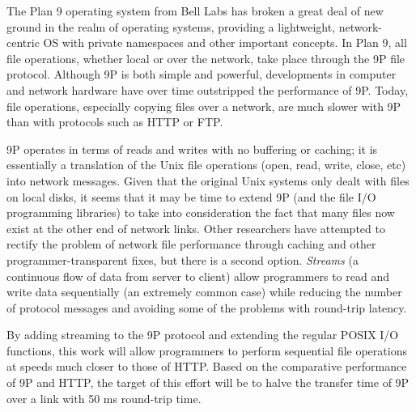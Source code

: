 \documentclass[12pt,american]{report}
\begin{document}
\beforepreface%

\renewcommand{\baselinestretch}{1.5}
\small\normalsize

\newcommand{\etc} {\emph{etc.\/}}
\newcommand{\etal}{\emph{et~al.\/}}
\newcommand{\eg}  {\emph{e.g.\/}}
\newcommand{\ie}  {\emph{i.e.\/}}

\begin{abstractpage}
The Plan 9 operating system from Bell Labs has broken a great deal of new ground in the realm of operating systems, providing a lightweight, network-centric OS with private namespaces and other important concepts. In Plan 9, all file operations, whether local or over the network, take place through the 9P file protocol. Although 9P is both simple and powerful, developments in computer and network hardware have over time outstripped the performance of 9P. Today, file operations, especially copying files over a network, are much slower with 9P than with protocols such as HTTP or FTP.

9P operates in terms of reads and writes with no buffering or caching; it is essentially a translation of the Unix file operations (open, read, write, close, etc) into network messages. Given that the original Unix systems only dealt with files on local disks, it seems that it may be time to extend 9P (and the file I/O programming libraries) to take into consideration the fact that many files now exist at the other end of network links. Other researchers have attempted to rectify the problem of network file performance through caching and other programmer-transparent fixes, but there is a second option. \emph{Streams} (a continuous flow of data from server to client) allow programmers to read and write data sequentially (an extremely common case) while reducing the number of protocol messages and avoiding some of the problems with round-trip latency. 

By adding streaming to the 9P protocol and extending the regular POSIX I/O functions, this work will allow programmers to perform sequential file operations at speeds much closer to those of HTTP. Based on the comparative performance of 9P and HTTP, the target of this effort will be to halve the transfer time of 9P over a link with 50 ms round-trip time.
\end{abstractpage}
\end{document}
